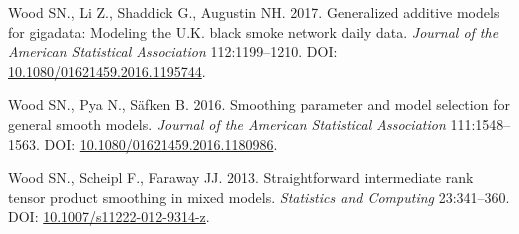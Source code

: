 \documentclass[12pt]{article}
\begin{document}
\hypertarget{ref-Wood2017-iy}{}
Wood SN., Li Z., Shaddick G., Augustin NH. 2017. Generalized additive
models for gigadata: Modeling the U.K. black smoke network daily data.
\emph{Journal of the American Statistical Association} 112:1199--1210.
DOI:
\href{https://doi.org/10.1080/01621459.2016.1195744}{10.1080/01621459.2016.1195744}.

\hypertarget{ref-wood_smoothing_2016}{}
Wood SN., Pya N., Säfken B. 2016. Smoothing parameter and model
selection for general smooth models. \emph{Journal of the American
Statistical Association} 111:1548--1563. DOI:
\href{https://doi.org/10.1080/01621459.2016.1180986}{10.1080/01621459.2016.1180986}.

\hypertarget{ref-wood_straightforward_2012}{}
Wood SN., Scheipl F., Faraway JJ. 2013. Straightforward intermediate
rank tensor product smoothing in mixed models. \emph{Statistics and
Computing} 23:341--360. DOI:
\href{https://doi.org/10.1007/s11222-012-9314-z}{10.1007/s11222-012-9314-z}.
\end{document}
